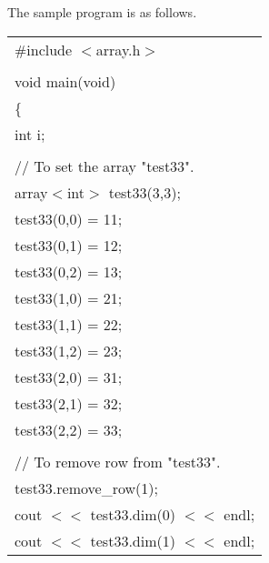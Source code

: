 \vspace*{5mm}

\noindent
The sample program is as follows.

\clearpage

{\small
\begin{center}
\begin{tabular}{|l|}\hline
\#include $<$array.h$>$\\
\hspace*{\textwidth}\\
void main(void)\\
\{\\
\hspace*{10mm}int i;\\
\\
\hspace*{10mm}// To set the array "test33".\\
\hspace*{10mm}array$<$int$>$ test33(3,3);\\
\hspace*{10mm}test33(0,0) = 11;\\
\hspace*{10mm}test33(0,1) = 12;\\
\hspace*{10mm}test33(0,2) = 13;\\
\hspace*{10mm}test33(1,0) = 21;\\
\hspace*{10mm}test33(1,1) = 22;\\
\hspace*{10mm}test33(1,2) = 23;\\
\hspace*{10mm}test33(2,0) = 31;\\
\hspace*{10mm}test33(2,1) = 32;\\
\hspace*{10mm}test33(2,2) = 33;\\
\\
\hspace*{10mm}// To remove row from "test33".\\
\hspace*{10mm}test33.remove\_row(1);\\
\hspace*{10mm}cout $<<$ test33.dim(0) $<<$ endl;\\
\hspace*{10mm}cout $<<$ test33.dim(1) $<<$ endl;\\

\end{tabular}
\end{center}}

